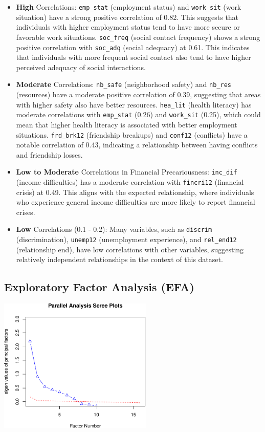 \documentclass[
]{article}
\begin{document}
\begin{itemize}
\item
  \textbf{High} Correlations: \texttt{emp\_stat} (employment status) and
  \texttt{work\_sit} (work situation) have a strong positive correlation
  of 0.82. This suggests that individuals with higher employment status
  tend to have more secure or favorable work situations.
  \texttt{soc\_freq} (social contact frequency) shows a strong positive
  correlation with \texttt{soc\_adq} (social adequacy) at 0.61. This
  indicates that individuals with more frequent social contact also tend
  to have higher perceived adequacy of social interactions.
\item
  \textbf{Moderate} Correlations: \texttt{nb\_safe} (neighborhood
  safety) and \texttt{nb\_res} (resources) have a moderate positive
  correlation of 0.39, suggesting that areas with higher safety also
  have better resources. \texttt{hea\_lit} (health literacy) has
  moderate correlations with \texttt{emp\_stat} (0.26) and
  \texttt{work\_sit} (0.25), which could mean that higher health
  literacy is associated with better employment situations.
  \texttt{frd\_brk12} (friendship breakups) and \texttt{conf12}
  (conflicts) have a notable correlation of 0.43, indicating a
  relationship between having conflicts and friendship losses.
\item
  \textbf{Low to Moderate} Correlations in Financial Precariousness:
  \texttt{inc\_dif} (income difficulties) has a moderate correlation
  with \texttt{fincri12} (financial crisis) at 0.49. This aligns with
  the expected relationship, where individuals who experience general
  income difficulties are more likely to report financial crises.
\item
  \textbf{Low} Correlations (0.1 - 0.2): Many variables, such as
  \texttt{discrim} (discrimination), \texttt{unemp12} (unemployment
  experience), and \texttt{rel\_end12} (relationship end), have low
  correlations with other variables, suggesting relatively independent
  relationships in the context of this dataset.
\end{itemize}

\subsection{Exploratory Factor Analysis
(EFA)}\label{exploratory-factor-analysis-efa}

\begin{center}
\includegraphics[width=0.55\textwidth,height=\textheight]{draft_v1_files/figure-pdf/unnamed-chunk-10-1.pdf}
\end{center}
\end{document}
